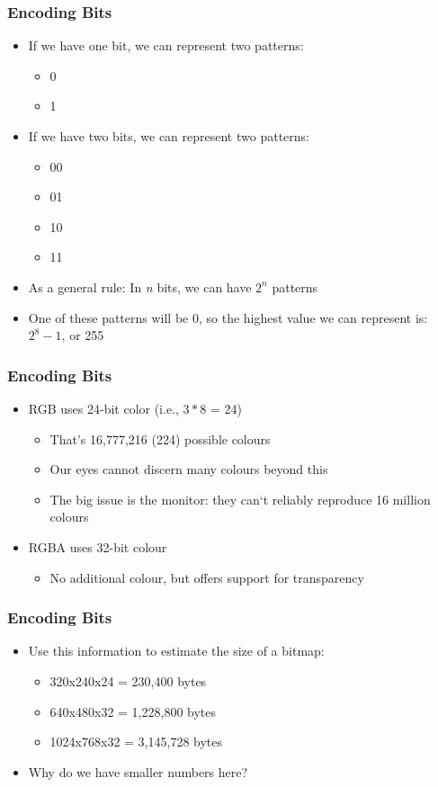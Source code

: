 
\begin{frame}
	\frametitle{Encoding Bits}
	
	\begin{itemize}
		\item If we have one bit, we can represent two patterns:
		\begin{itemize}
			\item 0
			\item 1
		\end{itemize}
		
		\item If we have two bits, we can represent two patterns:
		\begin{itemize}
			\item 00
			\item 01
			\item 10
			\item 11
		\end{itemize}
		\item As a general rule: In \textit{n} bits, we can have $2^n$ patterns
		\item One of these patterns will be 0, so the highest value we can represent is: $2^8 - 1$, or 255
	\end{itemize}
\end{frame}

\begin{frame}
	\frametitle{Encoding Bits}
	\begin{itemize}
		\item RGB uses 24-bit color (i.e., $3 * 8$ = 24)
		\begin{itemize}
			\item That's 16,777,216 (224) possible colours
			\item Our eyes cannot discern many colours beyond this
			\item The big issue is the monitor: they can`t reliably reproduce 16 million colours
		\end{itemize}
		\item RGBA uses 32-bit colour
		\begin{itemize}
			\item No additional colour, but offers support for transparency
		\end{itemize}
	\end{itemize}
\end{frame}

\begin{frame}
	\frametitle{Encoding Bits}
	\begin{itemize}
		\item Use this information to estimate the size of a bitmap:
		\begin{itemize}
			\item 320x240x24 = 230,400 bytes
			\item 640x480x32 = 1,228,800 bytes
			\item 1024x768x32 = 3,145,728 bytes
		\end{itemize}
		\item Why do we have smaller numbers here?
	\end{itemize}
\end{frame}

